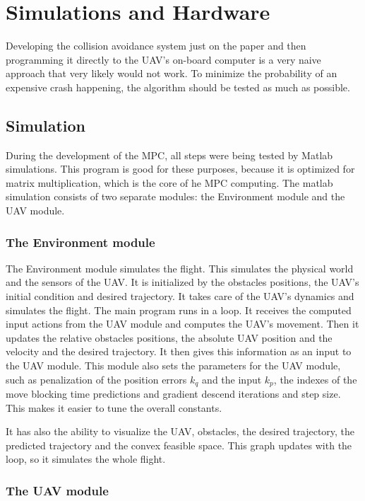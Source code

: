 \documentclass[a4paper,11pt,titlepage]{article}
\begin{document}
\section{Simulations and Hardware}

Developing the collision avoidance system just on the paper and then programming it directly to the UAV's on-board computer is a very naive approach that very likely would not work. To minimize the probability of an expensive crash happening, the algorithm should be tested as much as possible. 


\subsection{Simulation}

During the development of the MPC, all steps were being tested by Matlab simulations. This program is good for these purposes, because it is optimized for matrix multiplication, which is the core of he MPC computing. The matlab simulation consists of two separate modules: the Environment module and the UAV module. 

\subsubsection{The Environment module}

The Environment module simulates the flight. This simulates the physical world and the sensors of the UAV. It is initialized by the obstacles positions, the UAV's initial condition and desired trajectory. It takes care of the UAV's dynamics and simulates the flight. The main program runs in a loop. It receives the computed input actions from the UAV module and computes the UAV's movement. Then it updates the relative obstacles positions, the absolute UAV position and the velocity and the desired trajectory. It then gives this information as an input to the UAV module. 
This module also sets the parameters for the UAV module, such as penalization of the position errors $k_q$ and the input $k_p$, the indexes of the move blocking time predictions and gradient descend iterations and step size. This makes it easier to tune the overall constants.

It has also the ability to visualize the UAV, obstacles, the desired trajectory, the predicted trajectory and the convex feasible space. This graph updates with the loop, so it simulates the whole flight. 

\subsubsection{The UAV module}
\end{document}
